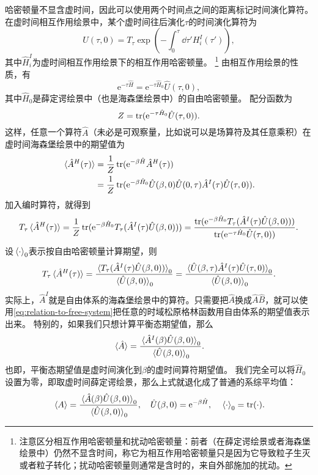 \documentclass[hyperref, UTF8, a4paper]{ctexart}
\newcommand*{\ee}{\mathrm{e}}
\begin{document}
哈密顿量不显含虚时间，因此可以使用两个时间点之间的距离标记时间演化算符。在虚时间相互作用绘景中，某个虚时间往后演化$\tau$的时间演化算符为
\begin{equation}
    \hat{U}(\tau, 0) = T_\tau \exp \left( - \int_0^\tau \dd{\tau'} H_i^I(\tau') \right),
\end{equation}
其中$\hat{H}_i^I$为虚时间相互作用绘景下的相互作用哈密顿量。%
\footnote{注意区分相互作用哈密顿量和扰动哈密顿量：前者（在薛定谔绘景或者海森堡绘景中）仍然不显含时间，称它为相互作用哈密顿量只是因为它导致粒子生灭或者粒子转化；扰动哈密顿量则通常是含时的，来自外部施加的扰动。}%
由相互作用绘景的性质，有
\[
    \ee^{-\tau \hat{H}} = \ee^{- \tau \hat{H}_0} \hat{U}(\tau, 0),
\]
其中$\hat{H}_0$是薛定谔绘景中（也是海森堡绘景中）的自由哈密顿量。
配分函数为
\[
    Z = \trace (\ee^{- \tau \hat{H}_0} \hat{U}(\tau, 0)).
\]
这样，任意一个算符$\hat{A}$（未必是可观察量，比如说可以是场算符及其任意乘积）在虚时间海森堡绘景中的期望值为
\[
    \begin{aligned}
        \expval*{\hat{A}^H (\tau)} &= \frac{1}{Z} \trace (\ee^{-\beta \hat{H}} \hat{A}^H (\tau)) \\
        &= \frac{1}{Z} \trace ( \ee^{-\beta \hat{H}_0} \hat{U}(\beta, 0) \hat{U}(0, \tau) \hat{A}^I(\tau) \hat{U}(\tau, 0) ).
    \end{aligned}
\]
加入编时算符，就得到
\[
    T_\tau \expval*{\hat{A}^H (\tau)} = \frac{1}{Z} \trace (\ee^{- \beta \hat{H}_0} T_\tau (\hat{A}^I(\tau) \hat{U}(\beta, 0))) = \frac{\trace (\ee^{- \beta \hat{H}_0} T_\tau (\hat{A}^I(\tau) \hat{U}(\beta, 0)))}{\trace (\ee^{- \tau \hat{H}_0} \hat{U}(\tau, 0))}.
\]
设$\expval*{\cdot}_0$表示按自由哈密顿量计算期望，则
\begin{equation}
    T_\tau \expval*{\hat{A}^H (\tau)} = \frac{\expval*{T_\tau (\hat{A}^I (\tau) \hat{U}(\beta, 0))}_0}{\expval*{\hat{U}(\beta, 0)}_0} = \frac{\expval*{\hat{U}(\beta, \tau) \hat{A}^I (\tau) \hat{U}(\tau, 0)}_0}{\expval*{\hat{U}(\beta, 0)}_0}.
    \label{eq:relation-to-free-system}
\end{equation}
实际上，$\hat{A}^I$就是自由体系的海森堡绘景中的算符。只需要把$\hat{A}$换成$\hat{A}\hat{B}$，就可以使用\eqref{eq:relation-to-free-system}把任意的时域松原格林函数用自由体系的期望值表示出来。
特别的，如果我们只想计算平衡态期望值，那么
\begin{equation}
    \expval*{\hat{A}} = \frac{\expval*{\hat{A}^I(\beta) \hat{U}(\beta, 0)}_0}{\expval*{\hat{U}(\beta, 0)}_0}.
\end{equation}
也即，平衡态期望值是虚时间演化到$\beta$的虚时间算符期望值。
我们完全可以将$\hat{H}_0$设置为零，即取虚时间薛定谔绘景，那么上式就退化成了普通的系综平均值：
\begin{equation}
    \expval*{A} = \frac{\expval*{\hat{A} (\beta) \hat{U}(\beta, 0)}_0}{\expval*{\hat{U}(\beta, 0)}_0}, \quad \hat{U}(\beta, 0) = \ee^{-\beta \hat{H}}, \quad \expval*{\cdot}_0 = \trace (\cdot).
\end{equation}
\end{document}
